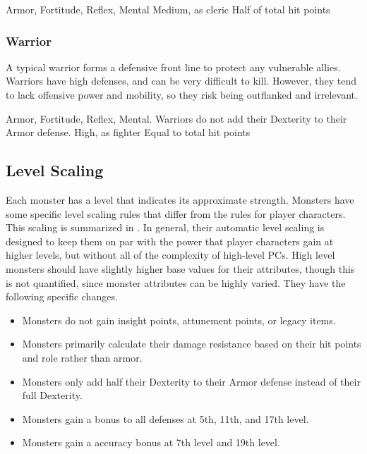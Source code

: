               Armor,  Fortitude,  Reflex,  Mental
             Medium, as cleric
             Half of total hit points

        \subsubsection{Warrior}
            A typical warrior forms a defensive front line to protect any vulnerable allies.
            Warriors have high defenses, and can be very difficult to kill.
            However, they tend to lack offensive power and mobility, so they risk being outflanked and irrelevant.

              Armor,  Fortitude,  Reflex,  Mental.
            Warriors do not add their Dexterity to their Armor defense.
             High, as fighter
             Equal to total hit points

    \subsection{Level Scaling}
        Each monster has a level that indicates its approximate strength.
        Monsters have some specific level scaling rules that differ from the rules for player characters.
        This scaling is summarized in .
        In general, their automatic level scaling is designed to keep them on par with the power that player characters gain at higher levels, but without all of the complexity of high-level PCs.
        High level monsters should have slightly higher base values for their attributes, though this is not quantified, since monster attributes can be highly varied.
        They have the following specific changes.
        \begin{itemize}
            \item Monsters do not gain insight points, attunement points, or legacy items.
            \item Monsters primarily calculate their damage resistance based on their hit points and role rather than armor.
            \item Monsters only add half their Dexterity to their Armor defense instead of their full Dexterity.
            \item Monsters gain a  bonus to all defenses at 5th, 11th, and 17th level.
            \item Monsters gain a  accuracy bonus at 7th level and 19th level.
        \end{itemize}

